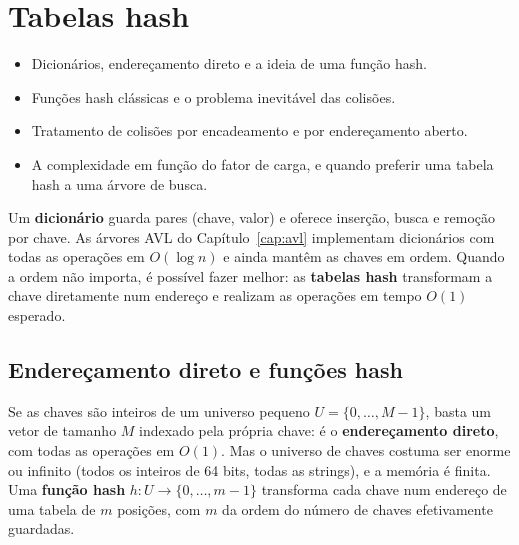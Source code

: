 \chapter{Tabelas hash}\label{cap:hash}\label{sec:hash}
\begin{objetivos}
\begin{itemize}
  \item Dicionários, endereçamento direto e a ideia de uma função hash.
  \item Funções hash clássicas e o problema inevitável das colisões.
  \item Tratamento de colisões por encadeamento e por endereçamento aberto.
  \item A complexidade em função do fator de carga, e quando preferir uma tabela hash a uma árvore de busca.
\end{itemize}
\end{objetivos}

Um \textbf{dicionário} guarda pares (chave, valor) e oferece inserção, busca e remoção por chave. As árvores AVL do Capítulo~\ref{cap:avl} implementam dicionários com todas as operações em $O(\log n)$ e ainda mantêm as chaves em ordem. Quando a ordem não importa, é possível fazer melhor: as \textbf{tabelas hash} transformam a chave diretamente num endereço e realizam as operações em tempo $O(1)$ esperado.

\section{Endereçamento direto e funções hash}\label{sec:hashfuncoes}
Se as chaves são inteiros de um universo pequeno $U=\{0,\dots,M-1\}$, basta um vetor de tamanho $M$ indexado pela própria chave: é o \textbf{endereçamento direto}, com todas as operações em $O(1)$. Mas o universo de chaves costuma ser enorme ou infinito (todos os inteiros de 64 bits, todas as strings), e a memória é finita. Uma \textbf{função hash} $h:U\to\{0,\dots,m-1\}$ transforma cada chave num endereço de uma tabela de $m$ posições, com $m$ da ordem do número de chaves efetivamente guardadas.

